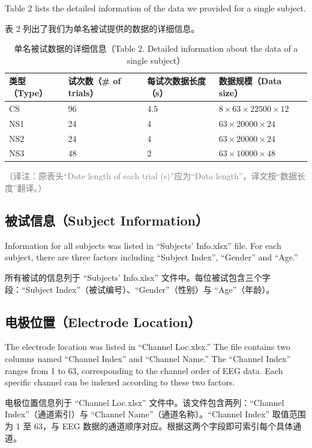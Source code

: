 \documentclass[11pt]{ctexart}
\newenvironment{en}{\begin{enbox}\color{black!85}}{\end{enbox}}
\newenvironment{zh}{\begin{zhbox}}{\end{zhbox}}
\newcommand{\tnote}[1]{\textcolor{gray}{\small（译注：#1）}}
\begin{document}
\begin{en}
Table 2 lists the detailed information of the data we provided for a single subject.
\end{en}
\begin{zh}
表 2 列出了我们为单名被试提供的数据的详细信息。
\end{zh}

\begin{table}[htbp]
\centering
\caption{单名被试数据的详细信息（Table 2. Detailed information about the data of a single subject）}
\begin{tabular}{llll}
\toprule
类型（Type） & 试次数（\# of trials） & 每试次数据长度（s） & 数据规模（Data size） \\
\midrule
CS  & 96 & 4.5 & $8\times63\times22500\times12$ \\
NS1 & 24 & 4   & $63\times20000\times24$ \\
NS2 & 24 & 4   & $63\times20000\times24$ \\
NS3 & 48 & 2   & $63\times10000\times48$ \\
\bottomrule
\end{tabular}
\end{table}
\tnote{原表头``Date length of each trial (s)''应为``Data length''，译文按``数据长度''翻译。}

\subsection{被试信息（Subject Information）}
\begin{en}
Information for all subjects was listed in ``Subjects' Info.xlsx'' file. For each subject, there are three factors including ``Subject Index'', ``Gender'' and ``Age.''
\end{en}
\begin{zh}
所有被试的信息列于 ``Subjects' Info.xlsx'' 文件中。每位被试包含三个字段：``Subject Index''（被试编号）、``Gender''（性别）与 ``Age''（年龄）。
\end{zh}

\subsection{电极位置（Electrode Location）}
\begin{en}
The electrode location was listed in ``Channel Loc.xlsx.'' The file contains two columns named ``Channel Index'' and ``Channel Name.'' The ``Channel Index'' ranges from 1 to 63, corresponding to the channel order of EEG data. Each specific channel can be indexed according to these two factors.
\end{en}
\begin{zh}
电极位置信息列于 ``Channel Loc.xlsx'' 文件中。该文件包含两列：``Channel Index''（通道索引）与 ``Channel Name''（通道名称）。``Channel Index'' 取值范围为 1 至 63，与 EEG 数据的通道顺序对应。根据这两个字段即可索引每个具体通道。
\end{zh}
\end{document}

